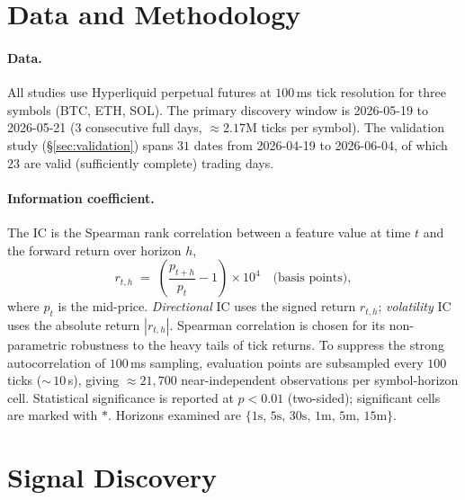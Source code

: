 \documentclass[11pt]{article}
\newcommand{\ic}{\textnormal{IC}}
\begin{document}
\section{Data and Methodology}\label{sec:methodology}

\paragraph{Data.}
All studies use Hyperliquid perpetual futures at $100\,$ms tick resolution for three
symbols (BTC, ETH, SOL). The primary discovery window is 2026-05-19 to 2026-05-21
($3$ consecutive full days, $\approx 2.17$M ticks per symbol). The validation study
(\S\ref{sec:validation}) spans $31$ dates from 2026-04-19 to 2026-06-04, of which $23$ are
valid (sufficiently complete) trading days.

\paragraph{Information coefficient.}
The \ic{} is the Spearman rank correlation between a feature value at time $t$ and the
forward return over horizon $h$,
\begin{equation}
  r_{t,h} \;=\; \left(\frac{p_{t+h}}{p_{t}} - 1\right)\times 10^{4}\quad\text{(basis points)},
\end{equation}
where $p_t$ is the mid-price. \emph{Directional} \ic{} uses the signed return $r_{t,h}$;
\emph{volatility} \ic{} uses the absolute return $|r_{t,h}|$. Spearman correlation is chosen
for its non-parametric robustness to the heavy tails of tick returns. To suppress the
strong autocorrelation of $100\,$ms sampling, evaluation points are subsampled every $100$
ticks ($\sim$\,$10\,$s), giving $\approx 21{,}700$ near-independent observations per
symbol-horizon cell. Statistical significance is reported at $p < 0.01$ (two-sided);
significant cells are marked with $*$. Horizons examined are
$\{1\text{s},\,5\text{s},\,30\text{s},\,1\text{m},\,5\text{m},\,15\text{m}\}$.

\section{Signal Discovery}\label{sec:discovery}
\end{document}
